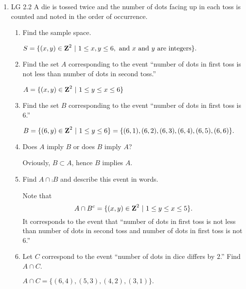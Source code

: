 \begin{enumerate}
	\item LG 2.2
	\ifdefined\sol
	A die is tossed twice and the number of dots facing up in each toss
	is counted and noted in the order of occurrence.
	\begin{enumerate}
		\item Find the sample space.
		\begin{solution}
		$ S = \{(x,y) \in{\mbox{\bf Z}}^2~|~ 1 \leq x, y\leq 6, \mbox{ and } x \mbox{ and } y \mbox{ are integers}\}.  $
		\end{solution}

		\item Find the set $A$ corresponding to the event
		``number of dots in first toss is not less
		than number of dots in second toss.''
		\begin{solution}
		$ A = \{(x,y) \in{\mbox{\bf Z}}^2~|~ 1 \leq y \leq  x\leq 6 \}$
		\end{solution}

		\item Find the set $B$ corresponding to the event
		``number of dots in first toss is $6$.''
		\begin{solution}
			$ B = \{(6,y)\in{\mbox{\bf Z}}^2~|~ 1\leq y\leq 6\}
			= \{ (6,1), (6,2), (6,3), (6,4), (6,5), (6,6) \}.$
		\end{solution}

		\item Does $A$ imply $B$ or does $B$ imply $A$?
		\begin{solution}
			Oviously, $B\subset A$, hence $B$ implies $A$.
		\end{solution}

		\item Find $A\cap \comp{B}$ and describe this event in words.
		\begin{solution}
			Note that
			\[
				A\cap {B}^c = \{(x,y)\in{\mbox{\bf Z}}^2~|~ 1\leq y\leq x\leq 5\}.
			\]
			It corresponds to the event
			that ``number of dots in first toss is not less
			than number of dots in second toss
			{and} number of dots in first toss is not $6$.''
		\end{solution}

		\item Let $C$ correspond to the event
		``number of dots in dice differs by $2$.''
		Find $A\cap C$.
		\begin{solution}
			$ A\cap C = \{ (6,4), (5,3), (4,2), (3,1) \}.  $
		\end{solution}

	\end{enumerate}
	\fi



\end{enumerate}

